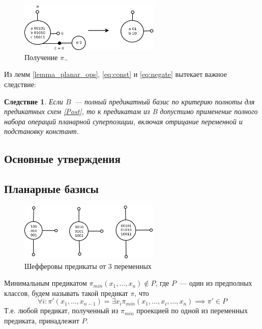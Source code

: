 \documentclass[12pt]{extarticle}
\newtheorem{corollary}[theorem]{Следствие}
\newenvironment{definition}[1][Определение.]{\begin{trivlist}
\item[\hskip \labelsep {\bfseries #1}]}{\end{trivlist}}
\begin{document}
\begin{figure}[htb]
\centering
\includegraphics[width=0.6\textwidth]{negate.png}
\caption{Получение $\pi_{\neg}$}
\label{fig:negation}
\end{figure}


Из лемм \ref{lemma_planar_ops}, \ref{eq:const} и \ref{eq:negate} вытекает важное следствие:
\begin{corollary}
\label{can_use_ops}
Если $B$~--- полный предикатный базис по критерию полноты для предикатных схем
\ref{Post}, то к предикатам из B допустимо применение полного набора операций 
планарной суперпозиции, включая отрицание переменной и подстановку констант.
\end{corollary}

\subsection{Основные утверждения}
\label{planar_chapter}
\subsection{Планарные базисы}

\begin{figure}[htb]
\centering
\includegraphics[width=0.6\textwidth]{scheff3.png}
\caption{Шефферовы предикаты от 3 переменных}
\label{fig:sheff}
\end{figure}

\label{planar_basis}

\begin{definition}
Минимальным предикатом $\pi_{min}(x_1, \dots, x_n) \notin P$, где $P$~--- один из предполных классов, будем называть такой 
предикат $\pi$, что $$\forall i: \pi'(x_1, \dots, x_{n-1}) = \exists x_i \pi_{min}(x_1, \dots, x_{i}, \dots, x_n) \implies \pi' \in P$$ 
Т.е. любой предикат,
полученный из $\pi_{min}$ проекцией по одной из переменных предиката, принадлежит $P$.
\end{definition}
\end{document}

